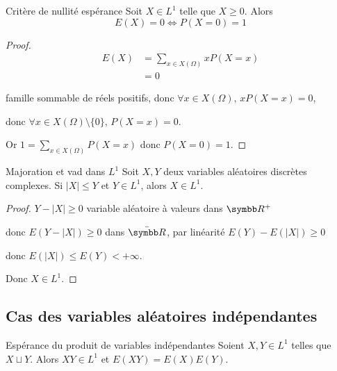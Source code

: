 \begin{proposition}{Critère de nullité espérance}{}
    Soit $X \in L^1$ telle que $X \geqslant 0$. Alors 
    $$ E(X) = 0 \iff P(X = 0) = 1 $$
    
\end{proposition}

\begin{proof}
    \begin{align}
        E(X) & = \sum_{x \in X(\Omega)} x P(X = x) \\
        & = 0
    \end{align}

    famille sommable de réels positifs, donc $\forall x \in X(\Omega), \, x P(X = x) = 0$, 

    donc $\forall x \in X(\Omega) \setminus \{0\}, \, P(X = x) = 0$.

    Or $\displaystyle 1 = \sum_{x \in X(\Omega)} P(X = x)$ donc $P(X = 0) = 1$.
\end{proof}

\begin{proposition}{Majoration et vad dans $L^1$}{}
    Soit $X, Y$ deux variables aléatoires discrètes complexes. Si 
    $|X| \leqslant Y$ et $Y \in L^1$, alors $X \in L^1$.
\end{proposition}


\begin{proof}
    $Y - |X| \geqslant 0$ variable aléatoire à valeurs dans $\R^+$ 
    
    donc $E(Y - |X|) \geqslant 0$ dans $\bar{\R}$, par linéarité $E(Y) - E(|X|) \geqslant 0$

    donc $E(|X|) \leqslant E(Y) < + \infty$.

    Donc $X \in L^1$.
\end{proof}

\subsection{Cas des variables aléatoires indépendantes }

\begin{theoreme}{Espérance du produit de variables indépendantes}{}
    Soient $X, Y \in L^1$ telles que $X \sqcup Y$. Alors 
    $XY \in L^1$ et $E(XY) = E(X) E(Y)$.
\end{theoreme}


